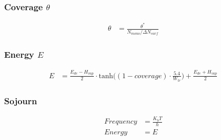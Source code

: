 \subsubsection*{Coverage $\theta$}
\begin{equation}
	\label{eq:cov}
	\begin{split}
		\theta&=\frac{\theta^*}{N_{mono}/\Delta N_{surf}}
	\end{split}
\end{equation}


\subsubsection*{Energy $E$}
\begin{equation}
	\label{eq:energy}
	\begin{split}
		E&=\frac{E_{de}-H_{vap}}{2} \cdot \text{tanh}\Big((1-coverage) \cdot \frac{5.4}{W_{tr}}\Big) + \frac{E_{de}+H_{vap}}{2}
	\end{split}
\end{equation}

\subsubsection*{Sojourn}
\begin{equation}
	\label{eq:sojourn}
	\begin{split}
		Frequency&=\frac{K_b T}{h}\\
		Energy&= E
	\end{split}
\end{equation}

